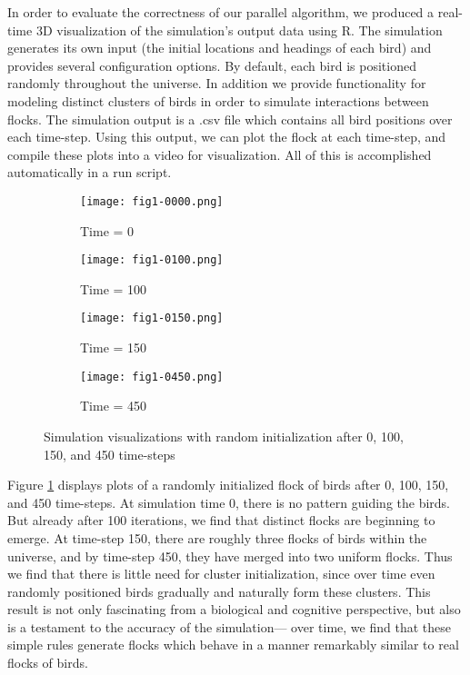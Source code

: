 In order to evaluate the correctness of our parallel algorithm, we
produced a real-time 3D visualization of the simulation's output data
using R. The simulation generates its own input (the initial locations
and headings of each bird) and provides several configuration
options. By default, each bird is positioned randomly throughout the
universe. In addition we provide functionality for modeling distinct
clusters of birds in order to simulate interactions between flocks.
The simulation output is a .csv file which contains all bird positions
over each time-step. Using this output, we can plot the flock at each
time-step, and compile these plots into a video for visualization. All
of this is accomplished automatically in a run script.

\begin{figure}[h!]
  \centering
  \begin{subfigure}{0.24\textwidth}
    \centering
    \texttt{[image: fig1-0000.png]}
    \caption{Time = 0}
  \end{subfigure}
  \begin{subfigure}{0.24\textwidth}
    \centering
    \texttt{[image: fig1-0100.png]}
    \caption{Time = 100}
  \end{subfigure}
  \begin{subfigure}{0.24\textwidth}
    \centering
    \texttt{[image: fig1-0150.png]}
    \caption{Time = 150}
  \end{subfigure}
  \begin{subfigure}{0.24\textwidth}
    \centering
    \texttt{[image: fig1-0450.png]}
    \caption{Time = 450}
  \end{subfigure}
  
  \caption{Simulation visualizations with random initialization after
    0, 100, 150, and 450 time-steps}
  \label{fig:visuals}
\end{figure}

Figure \ref{fig:visuals} displays plots of a randomly initialized
flock of birds after 0, 100, 150, and 450 time-steps. At simulation
time 0, there is no pattern guiding the birds. But already after 100
iterations, we find that distinct flocks are beginning to emerge. At
time-step 150, there are roughly three flocks of birds within the
universe, and by time-step 450, they have merged into two uniform
flocks. Thus we find that there is little need for cluster
initialization, since over time even randomly positioned birds
gradually and naturally form these clusters. This result is not only
fascinating from a biological and cognitive perspective, but also is
a testament to the accuracy of the simulation--- over time, we find
that these simple rules generate flocks which behave in a manner
remarkably similar to real flocks of birds.

